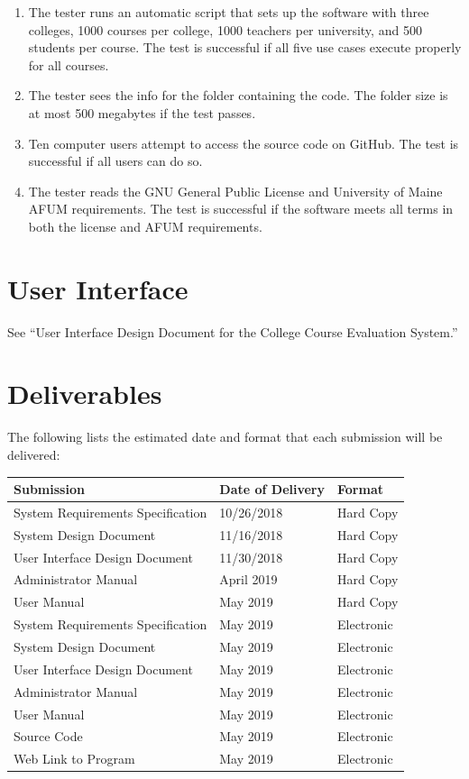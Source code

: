 \documentclass{article}
\begin{document}
\begin{enumerate}
  \item The tester runs an automatic script that sets up the software with three colleges, 1000 courses per college, 1000 teachers per university, and 500 students per course. The test is successful if all five use cases execute properly for all courses.
  \item The tester sees the info for the folder containing the code. The folder size is at most 500 megabytes if the test passes.
  \item Ten computer users attempt to access the source code on GitHub. The test is successful if all users can do so.
  \item The tester reads the GNU General Public License and University of Maine AFUM requirements. The test is successful if the software meets all terms in both the license and AFUM requirements.
\end{enumerate}

\section{User Interface}

See ``User Interface Design Document for the College Course Evaluation System.''

\section{Deliverables}

The following lists the estimated date and format that each submission will be delivered:

\begin{center}
\begin{tabular}{|p{6cm}|p{3cm}|p{3cm}|} 
\hline
\textbf{Submission} & \textbf{Date of Delivery} & \textbf{Format} \\
\hline
System Requirements Specification & 10/26/2018 & Hard Copy\\ 
\hline
System Design Document & 11/16/2018 & Hard Copy\\ 
\hline
User Interface Design Document & 11/30/2018 & Hard Copy\\ 
\hline
Administrator Manual & April 2019 & Hard Copy\\ 
\hline
User Manual & May 2019 & Hard Copy\\ 
\hline
System Requirements Specification & May 2019 & Electronic\\ 
\hline
System Design Document & May 2019 & Electronic\\ 
\hline
User Interface Design Document & May 2019 & Electronic\\ 
\hline
Administrator Manual & May 2019 & Electronic\\ 
\hline
User Manual & May 2019 & Electronic\\ 
\hline
Source Code & May 2019 & Electronic\\ 
\hline
Web Link to Program & May 2019 & Electronic\\ 
\hline
\end{tabular}
\end{center}
\end{document}
